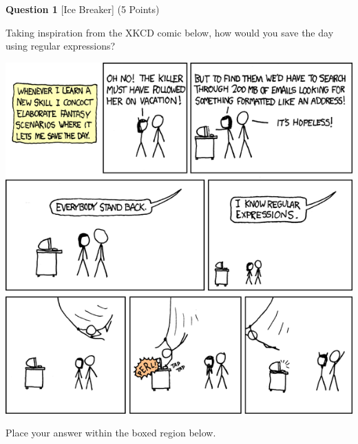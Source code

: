 \documentclass{report}
\begin{document}



\begin{minipage}{\textwidth}
    \noindent
        \textbf{Question 1} [Ice Breaker] (5 Points)
    \vspace{0.25cm}

    \noindent
    Taking inspiration from the XKCD comic below,
how would you save the day using regular expressions?

\begin{center}

\includegraphics[width=1.00\textwidth]{images/Regular Expressions/000.png}

\end{center}

    \vspace{0.25cm}

    Place your answer within the boxed region below.

        \vspace{0.25cm}


        \begin{center}


        \end{center}
\end{minipage}
\end{document}
